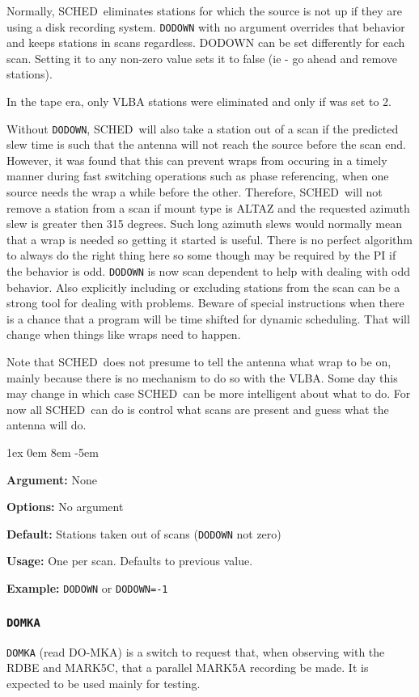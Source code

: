 \documentclass{report}
\newcommand{\schedb}{{\sc SCHED~}}
\newcommand{\rcwbox}[5]{
  \begin{list}{}{\parsep 1ex  \itemsep 0em
                 \leftmargin 8em  \itemindent -5em }
    \item {\bf Argument:} #1
    \item {\bf Options:}  #2
    \item {\bf Default:}  #3
    \item {\bf Usage:}    #4
    \item {\bf Example:}  #5
  \end{list}
}
\begin{document}
Normally, \schedb eliminates stations for which the source is not up
if they are using a disk recording system.  {\tt DODOWN} with no
argument overrides that behavior and keeps stations in scans
regardless.  DODOWN can be set differently for each scan.  Setting
it to any non-zero value sets it to false (ie - go ahead and remove
stations).

In the tape era, only VLBA stations were eliminated and only if
 was set to 2.

Without {\tt DODOWN}, \schedb will also take a station out of a scan
if the predicted slew time is such that the antenna will not reach the
source before the scan end.  However, it was found that this can
prevent wraps from occuring in a timely manner during fast switching
operations such as phase referencing, when one source needs the wrap a
while before the other.  Therefore, \schedb will not remove a station
from a scan if mount type is ALTAZ and the requested azimuth slew is
greater then 315 degrees.  Such long azimuth slews would normally mean
that a wrap is needed so getting it started is useful.  There is no
perfect algorithm to always do the right thing here so some though may
be required by the PI if the behavior is odd.  {\tt DODOWN} is now
scan dependent to help with dealing with odd behavior.  Also
explicitly including or excluding stations from the scan can be a
strong tool for dealing with problems.  Beware of special instructions
when there is a chance that a program will be time shifted for dynamic
scheduling.  That will change when things like wraps need to happen.

Note that \schedb does not presume to tell the antenna what wrap to be
on, mainly because there is no mechanism to do so with the VLBA.  Some
day this may change in which case \schedb can be more intelligent
about what to do.  For now all \schedb can do is control what scans
are present and guess what the antenna will do.

\rcwbox
{None}
{No argument}
{Stations taken out of scans ({\tt DODOWN} not zero)}
{One per scan.  Defaults to previous value.}
{{\tt DODOWN} or {\tt DODOWN=-1}}


\subsubsection{\label{MP:DOMKA}{\tt DOMKA}}

{\tt DOMKA} (read DO-MKA) is a switch to request that, when observing
with the RDBE and MARK5C, that a parallel MARK5A recording be made.
It is expected to be used mainly for testing.
\end{document}
